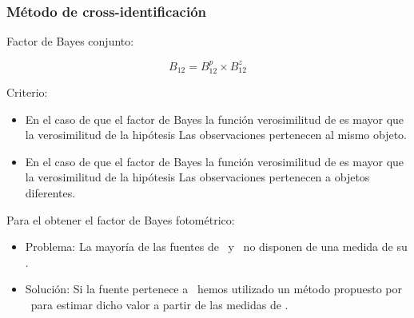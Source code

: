 \documentclass[8pt]{beamer}
\begin{document}
\begin{frame}

\frametitle{Método de cross-identificación}

Factor de Bayes conjunto:

\begin{equation*}
    B_{12}= B^{p}_{12}\times B^{z}_{12}
\end{equation*}

Criterio:

\begin{itemize}

\item En el caso de que el factor de Bayes  la función verosimilitud de  es mayor que la verosimilitud de la hipótesis  \maths{\implies} Las observaciones pertenecen al mismo objeto.

\item En el caso de que el factor de Bayes  la función verosimilitud de  es mayor que la verosimilitud de la hipótesis  \maths{\implies} Las observaciones pertenecen a objetos diferentes.
 
\end{itemize}

Para el obtener el factor de Bayes fotométrico:

\begin{itemize}
    \item \hspace{.1cm} Problema: La mayoría de las fuentes de \hatlas\ y \gama\ no disponen de una medida de su \rt.
    
    \item \hspace{.1cm} Solución: Si la fuente pertenece a \hatlas\ hemos utilizado un método propuesto por \gonzalez\ para estimar dicho valor a partir de las medidas de \spire.
    
\end{itemize}
    
\end{frame}
\end{document}
